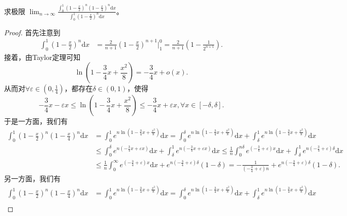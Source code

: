 \documentclass[../../main.tex]{subfiles}%
\begin{document}
\begin{example}
求极限 $\lim_{n\rightarrow \infty} \frac{\int_0^1{\left( 1-\frac{x}{2} \right) ^n\left( 1-\frac{x}{4} \right) ^n\mathrm{d}x}}{\int_0^1{\left( 1-\frac{x}{2} \right) ^n\mathrm{d}x}}$。
\end{example}
\begin{proof}
首先注意到
\begin{align}
\int_0^1{\left( 1-\frac{x}{2} \right) ^n\mathrm{d}x}&=\frac{2}{n+1}\left( 1-\frac{x}{2} \right) ^{n+1}\Big|_{1}^{0}=\frac{2}{n+1}\left( 1-\frac{1}{2^{n+1}} \right) .\label{example-Laplace0.7-0.0}
\end{align}
接着，由Taylor定理可知
\[
\ln \left( 1-\frac{3}{4}x+\frac{x^2}{8} \right) =-\frac{3}{4}x+o\left( x \right) .
\]
从而对$\forall \varepsilon \in \left( 0,\frac{1}{4} \right)$，都存在$\delta \in \left( 0,1 \right)$，使得
\[
-\frac{3}{4}x-\varepsilon x\leqslant \ln \left( 1-\frac{3}{4}x+\frac{x^2}{8} \right) \leqslant -\frac{3}{4}x+\varepsilon x,\forall x\in \left[ -\delta ,\delta \right] .
\]
于是一方面，我们有
\begin{align*}
\int_0^1{\left( 1-\frac{x}{2} \right) ^n\left( 1-\frac{x}{4} \right) ^n\mathrm{d}x}&=\int_0^1{e^{n\ln \left( 1-\frac{3}{4}x+\frac{x^2}{8} \right)}\mathrm{d}x}=\int_0^{\delta}{e^{n\ln \left( 1-\frac{3}{4}x+\frac{x^2}{8} \right)}\mathrm{d}x}+\int_{\delta}^1{e^{n\ln \left( 1-\frac{3}{4}x+\frac{x^2}{8} \right)}\mathrm{d}x}\\
&\leqslant \int_0^{\delta}{e^{n\left( -\frac{3}{4}x+\varepsilon x \right)}\mathrm{d}x}+\int_{\delta}^1{e^{n\left( -\frac{3}{4}x+\varepsilon x \right)}\mathrm{d}x}\leqslant \frac{1}{n}\int_0^{n\delta}{e^{\left( -\frac{3}{4}+\varepsilon \right) x}\mathrm{d}x}+\int_{\delta}^1{e^{n\left( -\frac{3}{4}+\varepsilon \right) \delta}\mathrm{d}x}\\
&\leqslant \frac{1}{n}\int_0^{\infty}{e^{\left( -\frac{3}{4}+\varepsilon \right) x}\mathrm{d}x}+e^{n\left( -\frac{3}{4}+\varepsilon \right) \delta}\left( 1-\delta \right) =-\frac{1}{\left( -\frac{3}{4}+\varepsilon \right) n}+e^{n\left( -\frac{3}{4}+\varepsilon \right) \delta}\left( 1-\delta \right) .
\end{align*}
另一方面，我们有
\begin{align*}
\int_0^1{\left( 1-\frac{x}{2} \right) ^n\left( 1-\frac{x}{4} \right) ^n\mathrm{d}x}&=\int_0^1{e^{n\ln \left( 1-\frac{3}{4}x+\frac{x^2}{8} \right)}\mathrm{d}x}=\int_0^{\delta}{e^{n\ln \left( 1-\frac{3}{4}x+\frac{x^2}{8} \right)}\mathrm{d}x}+\int_{\delta}^1{e^{n\ln \left( 1-\frac{3}{4}x+\frac{x^2}{8} \right)}\mathrm{d}x}\\

\end{align*}
\end{proof}
\end{document}
